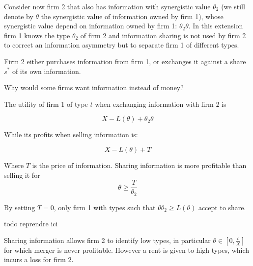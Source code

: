 \documentclass[a4paper]{article}
\renewcommand{\t}{\theta}
\begin{document}
Consider now firm 2 that also has information with synergistic value $\t_2$ (we still denote by $\t$ the synergistic value of information owned by firm 1), whose synergistic value depend on information owned by firm 1: $\t_2 \t$. In this extension firm 1 knows the type $\t_2$ of firm 2 and information sharing is not used by firm 2 to correct an information asymmetry but to separate firm 1 of different types.  

Firm 2 either purchases information from firm 1, or exchanges it against a share $s^*$ of its own information. 

Why would some firms want information instead of money?

The utility of firm 1 of type $t$ when exchanging information with firm 2 is

\[
X-L(\t)+\t_2 \t
\]

While its profits when selling information is:

\[
X-L(\t)+T
\]

Where $T$ is the price of information. Sharing information is more profitable than selling it for $$\t\geq \frac{T}{\t_2}$$


By setting $T=0$, only firm 1 with types such that $\t \t_2\geq L(\t)$ accept to share. 

todo reprendre ici

Sharing information allows firm 2 to identify low types, in particular $\t\in[0,\frac{c}{X}]$ for which merger is never profitable. However a rent is given to high types, which incurs a loss for firm 2.
\end{document}
